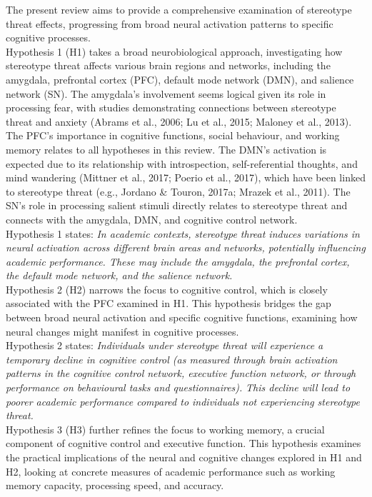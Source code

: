 \documentclass[
  stu, a4paper,floatsintext]{apa7}
\begin{document}
The present review aims to provide a comprehensive examination of stereotype threat effects, progressing from broad neural activation patterns to specific cognitive processes.\\
Hypothesis 1 (H1) takes a broad neurobiological approach, investigating how stereotype threat affects various brain regions and networks, including the amygdala, prefrontal cortex (PFC), default mode network (DMN), and salience network (SN).
The amygdala's involvement seems logical given its role in processing fear, with studies demonstrating connections between stereotype threat and anxiety (Abrams et al., 2006; Lu et al., 2015; Maloney et al., 2013).
The PFC's importance in cognitive functions, social behaviour, and working memory relates to all hypotheses in this review.
The DMN's activation is expected due to its relationship with introspection, self-referential thoughts, and mind wandering (Mittner et al., 2017; Poerio et al., 2017), which have been linked to stereotype threat (e.g., Jordano \& Touron, 2017a; Mrazek et al., 2011).
The SN's role in processing salient stimuli directly relates to stereotype threat and connects with the amygdala, DMN, and cognitive control network.\\
Hypothesis 1 states: \emph{In academic contexts, stereotype threat induces variations in neural activation across different brain areas and networks, potentially influencing academic performance. These may include the amygdala, the prefrontal cortex, the default mode network, and the salience network.}\\
Hypothesis 2 (H2) narrows the focus to cognitive control, which is closely associated with the PFC examined in H1.
This hypothesis bridges the gap between broad neural activation and specific cognitive functions, examining how neural changes might manifest in cognitive processes.\\
Hypothesis 2 states: \emph{Individuals under stereotype threat will experience a temporary decline in cognitive control (as measured through brain activation patterns in the cognitive control network, executive function network, or through performance on behavioural tasks and questionnaires).}
\emph{This decline will lead to poorer academic performance compared to individuals not experiencing stereotype threat.}\\
Hypothesis 3 (H3) further refines the focus to working memory, a crucial component of cognitive control and executive function.
This hypothesis examines the practical implications of the neural and cognitive changes explored in H1 and H2, looking at concrete measures of academic performance such as working memory capacity, processing speed, and accuracy.\\
\end{document}
